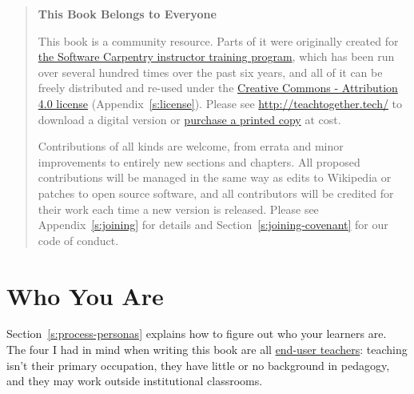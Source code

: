 \begin{quote}\setlength{\parindent}{0pt}
\textbf{This Book Belongs to Everyone}

This book is a community resource. Parts of it were originally
created for \href{http://carpentries.github.io/instructor-training/}{the Software Carpentry instructor training
program}, which has been run over several
hundred times over the past six years, and all of it can be freely
distributed and re-used under the \href{https://creativecommons.org/licenses/by/4.0/}{Creative Commons - Attribution
4.0 license} (Appendix~\ref{s:license}). Please see
\url{http://teachtogether.tech/} to download a digital version
or \href{http://www.lulu.com/commerce/index.php?fBuyContent=23123539}{purchase a printed copy} at cost.

Contributions of all kinds are welcome, from errata and minor
improvements to entirely new sections and chapters. All proposed
contributions will be managed in the same way as edits to Wikipedia
or patches to open source software, and all contributors will be
credited for their work each time a new version is released. Please
see Appendix~\ref{s:joining} for details and
Section~\ref{s:joining-covenant} for our code of conduct.
\end{quote}

\section{Who You Are}\label{s:intro-audience}

Section~\ref{s:process-personas} explains how to figure out who your
learners are. The four I had in mind when writing this book are all
\protect\hyperlink{g:end-user-teacher}{end-user teachers}: teaching isn't
their primary occupation, they have little or no background in pedagogy,
and they may work outside institutional classrooms.

